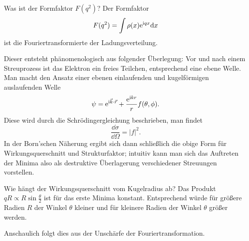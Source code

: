 \begin{fquestion}{Was ist der Formfaktor $F(q^2)$?}
    Der Formfaktor
    $$F(q^2) = \int \rho(x) \text{e}^{\text{i} q x} \dd x$$
    ist die Fouriertransformierte der Ladungsverteilung.
    
    Dieser entsteht phänomenologisch aus folgender Überlegung: Vor und nach einem Streuprozess ist das Elektron ein freies Teilchen, entsprechend eine ebene Welle.
    Man macht den Ansatz einer ebenen einlaufenden und kugelförmigen auslaufenden Welle 
    $$\psi = \text{e}^{ \text{i} \vec{k} \cdot\vec{r} } + \frac{\text{e}^{\text{i} kr}}{r} f(\theta, \phi).$$
    Diese wird durch die Schrödingergleichung beschrieben, man findet 
    $$\frac{\dd \sigma}{\dd \Omega} = |f|^2.$$
    In der Born'schen Näherung ergibt sich dann schließlich die obige Form für Wirkungsquerschnitt und Strukturfaktor; intuitiv kann man sich das Auftreten der Minima also als destruktive Überlagerung verschiedener Streuungen vorstellen.
\end{fquestion}





\begin{fquestion}{Wie hängt der Wirkungsquerschnitt vom Kugelradius ab?}
    Das Produkt $q R \propto R \sin \frac{\theta}{2}$ ist für das erste Minima konstant.
    Entsprechend würde für größere Radien $R$ der Winkel $\theta$ kleiner und für kleinere Radien der Winkel $\theta$ größer werden.
    
    Anschaulich folgt dies aus der Unschärfe der Fouriertransformation.
\end{fquestion}

